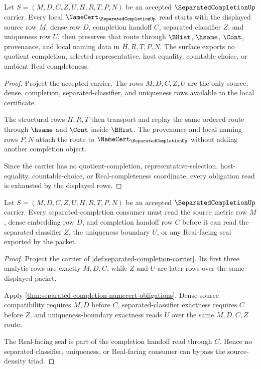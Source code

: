 \begin{theorem}
\label{thm:separated-completion-obligation-surface}
Let $S=(M,D,C,Z,U,H,R,T,P,N)$ be an accepted $\SeparatedCompletionUp$ carrier. Every local $\NameCert_{\SeparatedCompletionUp}$ read starts with the displayed source row $M$, dense row $D$, completion handoff $C$, separated classifier $Z$, and uniqueness row $U$, then preserves that route through $\BHist$, $\hsame$, $\Cont$, provenance, and local naming data in $H,R,T,P,N$. The surface exports no quotient completion, selected representative, host equality, countable choice, or ambient Real completeness.
\end{theorem}
\begin{proof}
Project the accepted carrier. The rows $M,D,C,Z,U$ are the only source, dense, completion, separated-classifier, and uniqueness rows available to the local certificate.

The structural rows $H,R,T$ then transport and replay the same ordered route through $\hsame$ and $\Cont$ inside $\BHist$. The provenance and local naming rows $P,N$ attach the route to $\NameCert_{\SeparatedCompletionUp}$ without adding another completion object.

Since the carrier has no quotient-completion, representative-selection, host-equality, countable-choice, or Real-completeness coordinate, every obligation read is exhausted by the displayed rows.
\end{proof}

\begin{theorem}
\label{thm:separatedcompletion-source-density-triad}
Let $S=(M,D,C,Z,U,H,R,T,P,N)$ be an accepted $\SeparatedCompletionUp$ carrier. Every separated-completion consumer must read the source metric row $M$, dense embedding row $D$, and completion handoff row $C$ before it can read the separated classifier $Z$, the uniqueness boundary $U$, or any Real-facing seal exported by the packet.
\end{theorem}
\begin{proof}
Project the carrier of \autoref{def:separated-completion-carrier}. Its first three analytic rows are exactly $M,D,C$, while $Z$ and $U$ are later rows over the same displayed packet.

Apply \autoref{thm:separated-completion-namecert-obligations}. Dense-source compatibility requires $M,D$ before $C$, separated-classifier exactness requires $C$ before $Z$, and uniqueness-boundary exactness reads $U$ over the same $M,D,C,Z$ route.

The Real-facing seal is part of the completion handoff read through $C$. Hence no separated classifier, uniqueness, or Real-facing consumer can bypass the source-density triad.
\end{proof}

